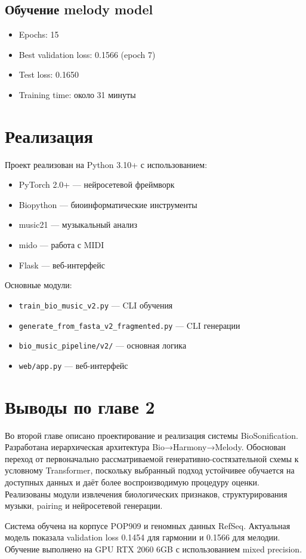 \subsection{Обучение melody model}

\begin{itemize}
\item Epochs: 15
\item Best validation loss: 0.1566 (epoch 7)
\item Test loss: 0.1650
\item Training time: около 31 минуты
\end{itemize}

\section{Реализация}

Проект реализован на Python 3.10+ с использованием:
\begin{itemize}
\item PyTorch 2.0+ — нейросетевой фреймворк~\cite{pytorch}
\item Biopython — биоинформатические инструменты~\cite{cock2009}
\item music21 — музыкальный анализ~\cite{music21}
\item mido — работа с MIDI
\item Flask — веб-интерфейс
\end{itemize}

Основные модули:
\begin{itemize}
\item \texttt{train\_bio\_music\_v2.py} — CLI обучения
\item \texttt{generate\_from\_fasta\_v2\_fragmented.py} — CLI генерации
\item \texttt{bio\_music\_pipeline/v2/} — основная логика
\item \texttt{web/app.py} — веб-интерфейс
\end{itemize}

\section*{Выводы по главе 2}

Во второй главе описано проектирование и реализация системы BioSonification. Разработана иерархическая архитектура Bio→Harmony→Melody. Обоснован переход от первоначально рассматриваемой генеративно-состязательной схемы к условному Transformer, поскольку выбранный подход устойчивее обучается на доступных данных и даёт более воспроизводимую процедуру оценки. Реализованы модули извлечения биологических признаков, структурирования музыки, pairing и нейросетевой генерации.

Система обучена на корпусе POP909 и геномных данных RefSeq. Актуальная модель показала validation loss 0.1454 для гармонии и 0.1566 для мелодии. Обучение выполнено на GPU RTX 2060 6GB с использованием mixed precision.
